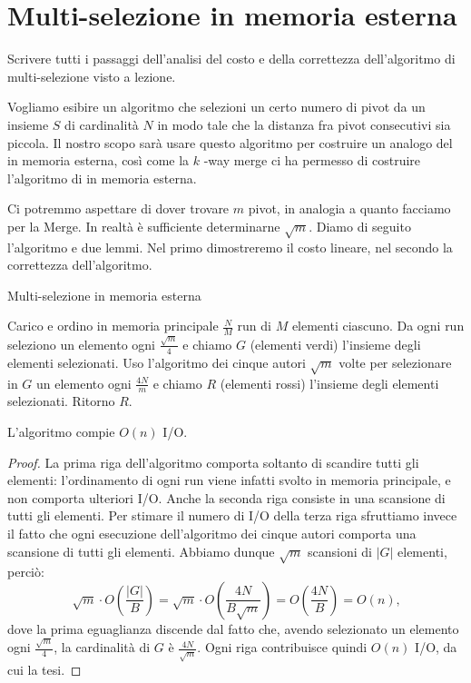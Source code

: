 \chapter{Multi-selezione in memoria esterna}    

\begin{problem*}
    Scrivere tutti i passaggi dell'analisi del costo e della correttezza
    dell'algoritmo di multi-selezione visto a lezione.
\end{problem*}

Vogliamo esibire un algoritmo che selezioni un certo numero di pivot da un
insieme \(S\) di cardinalit\`a \(N\) in modo tale che la distanza fra pivot
consecutivi sia piccola. Il nostro scopo sar\`a usare questo algoritmo per
costruire un analogo del \quicksort in memoria esterna, cos\`i come la \(k\)
-way merge ci ha permesso di costruire l'algoritmo di \mergesort in 
memoria esterna.

Ci potremmo aspettare di dover trovare \(m\) pivot, in analogia a quanto
facciamo per la Merge. In realt\`a \`e sufficiente determinarne \(\sqrt{m}\).
Diamo di seguito l'algoritmo e due lemmi. Nel primo dimostreremo il costo
lineare, nel secondo la correttezza dell'algoritmo.

\begin{algorithm}
    \caption{Multi-selezione in memoria esterna}
    \begin{algorithmic}[1]
        \State Carico e ordino in memoria principale \(\frac{N}{M}\) run
        di \(M\) elementi ciascuno.
        \State Da ogni run seleziono un elemento ogni 
        \(\frac{\sqrt{m}}{4}\) e chiamo \(G\) (elementi verdi) l'insieme 
        degli elementi selezionati.
        \State Uso l'algoritmo dei cinque autori \(\sqrt{m}\) volte per
        selezionare in \(G\) un elemento ogni \(\frac{4N}{m}\) e chiamo 
        \(R\) (elementi rossi) l'insieme degli elementi selezionati.
        \State Ritorno \(R\).
    \end{algorithmic}
\end{algorithm}

\begin{lemma}[Costo]
    L'algoritmo compie \(O(n)\) I/O.
\end{lemma}
\begin{proof}
    La prima riga dell'algoritmo comporta soltanto di scandire tutti gli
    elementi: l'ordinamento di ogni run viene infatti svolto in memoria
    principale, e non comporta ulteriori I/O. Anche la seconda riga
    consiste in una scansione di tutti gli elementi. Per stimare il numero
    di I/O della terza riga sfruttiamo invece il fatto che ogni esecuzione
    dell'algoritmo dei cinque autori comporta una scansione di tutti gli
    elementi. Abbiamo dunque \(\sqrt{m}\) scansioni di \(|G|\) elementi,
    perci\`o:
    \[
        \sqrt{m}\cdot O\left(\frac{|G|}{B}\right) = \sqrt{m}\cdot O\left(\frac{4N}{B\sqrt{m}}\right) = O\left(\frac{4N}{B}\right) = O(n)\mbox{,}
    \]
    dove la prima eguaglianza discende dal fatto che, avendo selezionato
    un elemento ogni \(\frac{\sqrt{m}}{4}\), la cardinalit\`a di \(G\) \`e
    \(\frac{4N}{\sqrt{m}}\). Ogni riga contribuisce quindi \(O(n)\) I/O, da cui la tesi.
\end{proof}

